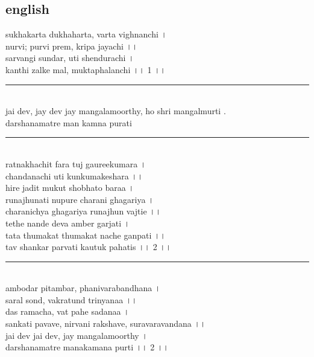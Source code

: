 \documentclass[letterpaper,twocolumn,openany,nodeprecatedcode]{dndbook}
\begin{document}
\begin{flushleft}
  \subsection*{english}
  sukhakarta dukhaharta, varta vighnanchi । \\
  nurvi; purvi prem, kripa jayachi ।।\\
  sarvangi sundar, uti shendurachi ।\\
  kanthi zalke mal, muktaphalanchi ।। 1 ।। \\
  \rule{\linewidth}{1pt} \\
  jai dev, jay dev jay mangalamoorthy, ho shri mangalmurti . \\ darshanamatre man kamna purati
  \rule{\linewidth}{1pt} \\
  ratnakhachit fara tuj gaureekumara । \\
  chandanachi uti kunkumakeshara ।। \\
  hire jadit mukut shobhato baraa । \\
  runajhunati nupure charani ghagariya । \\
  charanichya ghagariya runajhun vajtie ।। \\
  tethe nande deva amber garjati । \\
  tata thumakat thumakat nache ganpati ।। \\
  tav shankar parvati kautuk pahatis ।। 2 ।।\\
  \rule{\linewidth}{1pt} \\
  ambodar pitambar, phanivarabandhana । \\
  saral sond, vakratund trinyanaa ।। \\
  das ramacha, vat pahe sadanaa । \\
  sankati pavave, nirvani rakshave, suravaravandana ।। \\
  jai dev jai dev, jay mangalamoorthy । \\
  darshanamatre manakamana purti ।। 2 ।। \\
\end{flushleft}
\pagebreak
\end{document}
